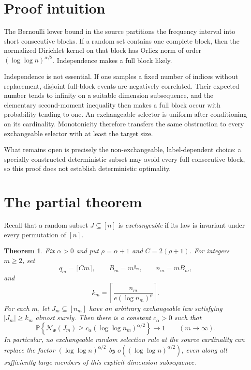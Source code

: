\documentclass[11pt]{article}
\newtheorem{theorem}{Theorem}
\newcommand{\Pp}{\mathbb P}
\begin{document}
\section{Proof intuition}

The Bernoulli lower bound in the source partitions the frequency interval into
short consecutive blocks.  If a random set contains one complete block, then
the normalized Dirichlet kernel on that block has Orlicz norm of order
$(\log\log n)^{\alpha/2}$.  Independence makes a full block likely.

Independence is not essential.  If one samples a fixed number of indices
without replacement, disjoint full-block events are negatively correlated.
Their expected number tends to infinity on a suitable dimension subsequence,
and the elementary second-moment inequality then makes a full block occur
with probability tending to one.  An exchangeable selector is uniform after
conditioning on its cardinality.  Monotonicity therefore transfers the same
obstruction to every exchangeable selector with at least the target size.

What remains open is precisely the non-exchangeable, label-dependent choice:
a specially constructed deterministic subset may avoid every full consecutive
block, so this proof does not establish deterministic optimality.

\section{The partial theorem}

Recall that a random subset $J\subseteq[n]$ is \emph{exchangeable} if its law
is invariant under every permutation of $[n]$.

\begin{theorem}\label{thm:main}
Fix $\alpha>0$ and put $\rho=\alpha+1$ and
$C=2(\rho+1)$.  For integers $m\ge2$, set
\[
 q_m=\lceil Cm\rceil,\qquad
 B_m=m^{q_m},\qquad
 n_m=mB_m,
\]
and
\[
 k_m=\left\lceil
 \frac{n_m}{e(\log n_m)^\rho}
 \right\rceil.
\]
For each $m$, let $J_m\subseteq[n_m]$ have an arbitrary exchangeable law
satisfying $|J_m|\ge k_m$ almost surely.  Then there is a constant
$c_\alpha>0$ such that
\[
 \Pp\left\{
 \mathcal N_\Phi(J_m)
 \ge c_\alpha(\log\log n_m)^{\alpha/2}
 \right\}\longrightarrow1
 \qquad(m\to\infty).
\]
In particular, no exchangeable random selection rule at the source
cardinality can replace the factor $(\log\log n)^{\alpha/2}$ by
$o((\log\log n)^{\alpha/2})$, even along all sufficiently large members of
this explicit dimension subsequence.
\end{theorem}
\end{document}
